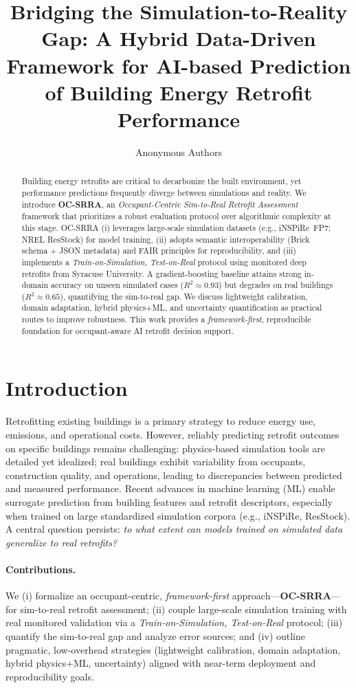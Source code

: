 \documentclass{article}
\title{Bridging the Simulation-to-Reality Gap: A Hybrid Data-Driven Framework for AI-based Prediction of Building Energy Retrofit Performance}
\author{Anonymous Authors}
\begin{document}
\maketitle

\begin{abstract}
Building energy retrofits are critical to decarbonize the built environment, yet performance predictions frequently diverge between simulations and reality. 
We introduce \textbf{OC-SRRA}, an \emph{Occupant-Centric Sim-to-Real Retrofit Assessment} framework that prioritizes a robust evaluation protocol over algorithmic complexity at this stage. 
OC-SRRA (i) leverages large-scale simulation datasets (e.g., iNSPiRe~FP7; NREL ResStock) for model training, (ii) adopts semantic interoperability (Brick schema + JSON metadata) and FAIR principles for reproducibility, and (iii) implements a \emph{Train-on-Simulation, Test-on-Real} protocol using monitored deep retrofits from Syracuse University. 
A gradient-boosting baseline attains strong in-domain accuracy on unseen simulated cases ($R^2\!\approx\!0.93$) but degrades on real buildings ($R^2\!\approx\!0.65$), quantifying the sim-to-real gap. 
We discuss lightweight calibration, domain adaptation, hybrid physics+ML, and uncertainty quantification as practical routes to improve robustness. 
This work provides a \emph{framework-first}, reproducible foundation for occupant-aware AI retrofit decision support.
\end{abstract}

\section{Introduction}
Retrofitting existing buildings is a primary strategy to reduce energy use, emissions, and operational costs. 
However, reliably predicting retrofit outcomes on specific buildings remains challenging: physics-based simulation tools are detailed yet idealized; real buildings exhibit variability from occupants, construction quality, and operations, leading to discrepancies between predicted and measured performance.
Recent advances in machine learning (ML) enable surrogate prediction from building features and retrofit descriptors, especially when trained on large standardized simulation corpora (e.g., iNSPiRe, ResStock). 
A central question persists: \emph{to what extent can models trained on simulated data generalize to real retrofits?}

\paragraph{Contributions.}
We (i) formalize an occupant-centric, \emph{framework-first} approach---\textbf{OC-SRRA}---for sim-to-real retrofit assessment; 
(ii) couple large-scale simulation training with real monitored validation via a \emph{Train-on-Simulation, Test-on-Real} protocol; 
(iii) quantify the sim-to-real gap and analyze error sources; and 
(iv) outline pragmatic, low-overhead strategies (lightweight calibration, domain adaptation, hybrid physics+ML, uncertainty) aligned with near-term deployment and reproducibility goals.
\end{document}
